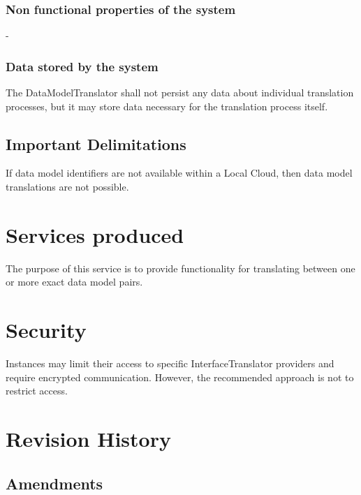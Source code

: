\documentclass[a4paper]{arrowhead}
\begin{document}
\subsubsection {Non functional properties of the system}
-

\subsubsection {Data stored by the system}

The DataModelTranslator shall not persist any data about individual translation processes, but it may store data necessary for the translation process itself.

\subsection{Important Delimitations}
\label{sec:delimitations}

If data model identifiers are not available within a Local Cloud, then data model translations are not possible.

\section{Services produced}
\label{sec:services}

{}

The purpose of this service is to provide functionality for translating between
one or more exact data model pairs.

\section{Security}
\label{sec:security}

Instances may limit their access to specific InterfaceTranslator providers and require encrypted communication.
However, the recommended approach is not to restrict access.

\newpage




\newpage

\section{Revision History}
\subsection{Amendments}
\end{document}
